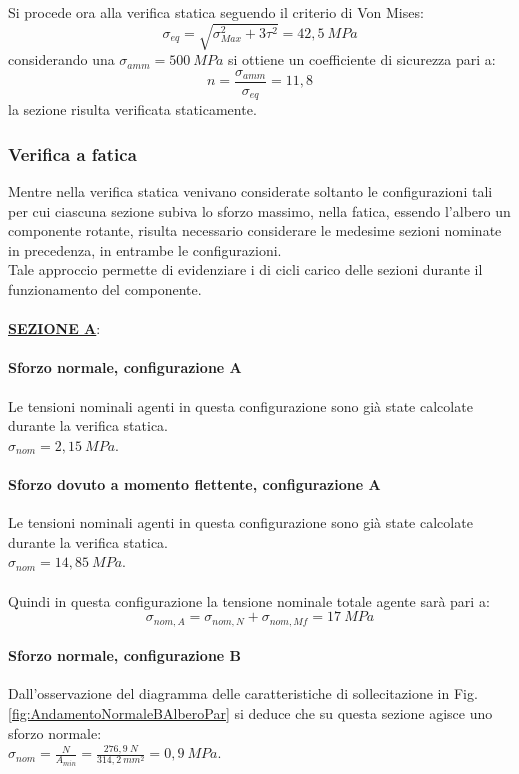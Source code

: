Si procede ora alla verifica statica seguendo il criterio di Von Mises:
\begin{equation}
    \sigma_{eq}=\sqrt{\sigma_{Max}^2+3\tau^2}=42,5\ MPa
\end{equation}
considerando una $\sigma_{amm}=500\ MPa$ si ottiene un coefficiente di sicurezza pari a:
\begin{equation}
    n=\frac{\sigma_{amm}}{\sigma_{eq}}=11,8
\end{equation}
la sezione risulta verificata staticamente.
\subsubsection{Verifica a fatica}
Mentre nella verifica statica venivano considerate soltanto le configurazioni tali per cui ciascuna sezione subiva lo sforzo massimo, nella fatica, essendo l'albero un componente rotante, risulta necessario considerare le medesime sezioni nominate in precedenza, in entrambe le configurazioni. \\
Tale approccio permette di evidenziare i di cicli carico delle sezioni durante il funzionamento del componente.\\
\\
\underline{\textbf{SEZIONE A}}:
\paragraph{Sforzo normale, configurazione A} Le tensioni nominali agenti in questa configurazione sono già state calcolate durante la verifica statica.\\
$\sigma_{nom}=2,15\ MPa$.
\paragraph{Sforzo dovuto a momento flettente, configurazione A} Le tensioni nominali agenti in questa configurazione sono già state calcolate durante la verifica statica.\\
$\sigma_{nom}=14,85\ MPa$.\\
\\
Quindi in questa configurazione la tensione nominale totale agente sarà pari a:
\begin{equation}
    \sigma_{nom,A}=\sigma_{nom,N}+\sigma_{nom,Mf}=17\ MPa
\end{equation}
\paragraph{Sforzo normale, configurazione B} Dall'osservazione del diagramma delle caratteristiche di sollecitazione in Fig.\ref{fig:AndamentoNormaleBAlberoPar} si deduce che su questa sezione agisce uno sforzo normale:\\
$\sigma_{nom}=\frac{N}{A_{min}}=\frac{276,9\ N}{314,2\ mm^2}=0,9\ MPa.$
